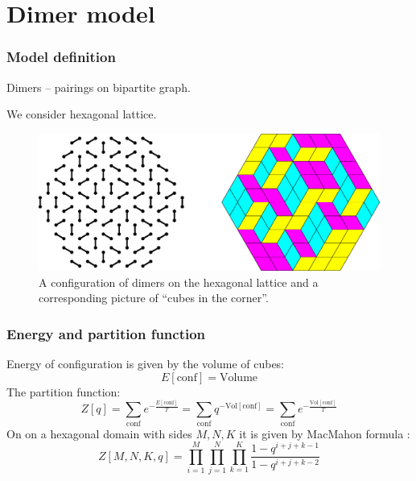 \documentclass[pdftex]{beamer}
\theoremstyle{definition} \newtheorem{Def}{Definition}
\begin{document}
\section{Dimer model}
\begin{frame}
  \frametitle{Model definition}
  Dimers -- pairings on bipartite graph.
  
  We consider hexagonal lattice. 
  \begin{figure}
    \includegraphics[scale=0.35]{loz}
    \caption{\label{dhf}A configuration of dimers on the hexagonal lattice and a corresponding picture of ``cubes in the corner''.}
  \end{figure}
\end{frame}
\begin{frame}
  \frametitle{Energy and partition function}
  Energy of configuration is given by the volume of cubes:
    \begin{equation}
    \label{eq:10}
    E[\mathrm{conf}]=\mathrm{Volume}
  \end{equation}
  The partition function:
  \begin{equation}
    \label{eq:14}
    Z[q]=\sum_{\mathrm{conf}} e^{-\frac{E[\mathrm{conf}]}{T}}=\sum_{\mathrm{conf}}q^{-\mathrm{Vol}[\mathrm{conf}]}=\sum_{\mathrm{conf}}e^{-\frac{\mathrm{Vol[conf]}}{T}}
  \end{equation}
  On on a hexagonal domain with sides $M,N,K$ it is given by MacMahon formula :
  \begin{equation}
    \label{eq:12}
       Z[M,N,K,q]=\prod_{i=1}^{M}\prod_{j=1}^{N}\prod_{k=1}^{K}\frac{1-q^{i+j+k-1}}{1-q^{i+j+k-2}}
  \end{equation}

\end{frame}
\end{document}
